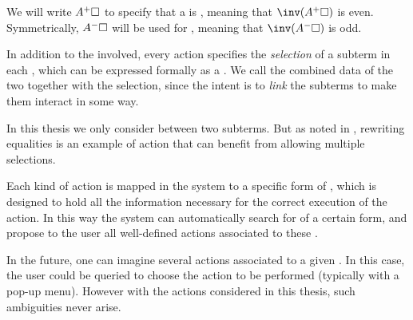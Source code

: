 \begin{scope}
\begin{definition}[Polarity]\label{def:polarity}
We will write $A^+\square$ to specify that a  is ,
meaning that $\inv(A^+\hole)$ is even. Symmetrically, $A^-\square$ will be used
for  , meaning that $\inv(A^-\hole)$ is odd.
\end{definition}


In addition to the  involved, every  action specifies the
\emph{selection} of a subterm in each , which can be expressed formally as a
. We call  the combined data of the two  together
with the selection, since the intent is to \emph{link} the subterms to make them
interact in some way.

\begin{remark}
In this thesis we only consider  between two subterms. But as noted
in , rewriting equalities is an example of action that can
benefit from allowing multiple selections.
\end{remark}

Each kind of  action is mapped in the system to a specific form of ,
which is designed to hold all the information necessary for the correct
execution of the action. In this way the system can automatically search for
 of a certain form, and propose to the user all well-defined actions
associated to these .

\begin{remark}
  In the future, one can imagine several  actions associated to a given
  . In this case, the user could be queried to choose the action to be
  performed (typically with a pop-up menu). However with the actions considered
  in this thesis, such ambiguities never arise.
\end{remark}


\end{scope}
